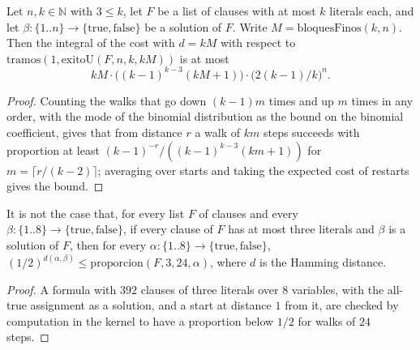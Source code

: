 \begin{theorem}
  \label{thm:search-tiempo-fino-general}
  \leanok
  Let $n, k \in \mathbb{N}$ with $3 \le k$, let $F$ be a list of clauses with at most $k$ literals
  each, and let $\beta : \{1..n\} \to \{\mathrm{true}, \mathrm{false}\}$ be a solution of $F$. Write $M =
  \mathrm{bloquesFinos}(k, n)$. Then the integral of the cost with $d = kM$ with respect to
  $\mathrm{tramos}(1, \mathrm{exitoU}(F, n, k, kM))$ is at most
  \[
    kM \cdot \bigl((k-1)^{k-3} (kM + 1)\bigr) \cdot \bigl(2(k-1)/k\bigr)^n .
  \]
\end{theorem}

\begin{proof}
  \leanok
  Counting the walks that go down $(k-1)m$ times and up $m$ times in any order, with the mode of
  the binomial distribution as the bound on the binomial coefficient, gives that from distance $r$
  a walk of $km$ steps succeeds with proportion at least $(k-1)^{-r}/((k-1)^{k-3}(km+1))$ for
  $m = \lceil r / (k-2) \rceil$; averaging over starts and taking the expected cost of restarts
  gives the bound.
\end{proof}

\begin{theorem}
  \label{thm:search-schoening-falso}
  \leanok
  It is not the case that, for every list $F$ of clauses and every $\beta : \{1..8\} \to
  \{\mathrm{true}, \mathrm{false}\}$, if every clause of $F$ has at most three literals and $\beta$ is
  a solution of $F$, then for every $\alpha : \{1..8\} \to \{\mathrm{true}, \mathrm{false}\}$,
  $(1/2)^{d(\alpha, \beta)} \le \mathrm{proporcion}(F, 3, 24, \alpha)$, where $d$ is the Hamming
  distance.
\end{theorem}

\begin{proof}
  \leanok
  A formula with $392$ clauses of three literals over $8$ variables, with the all-true assignment as
  a solution, and a start at distance $1$ from it, are checked by computation in the kernel to have
  a proportion below $1/2$ for walks of $24$ steps.
\end{proof}

